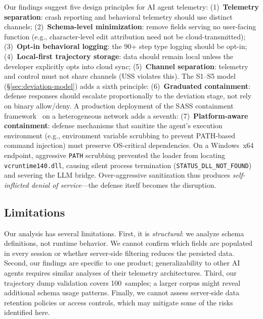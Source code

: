 \documentclass[sigconf,anonymous]{acmart}
\newcommand{\uss}{\textsc{USS}\xspace}              %
\begin{document}
Our findings suggest five design principles for AI agent telemetry:
(1)~\textbf{Telemetry separation}: crash reporting and behavioral
telemetry should use distinct channels;
(2)~\textbf{Schema-level minimization}: remove fields serving no
user-facing function (e.g., character-level edit attribution need not
be cloud-transmitted);
(3)~\textbf{Opt-in behavioral logging}: the 90+ step type logging
should be opt-in;
(4)~\textbf{Local-first trajectory storage}: data should remain local
unless the developer explicitly opts into cloud sync;
(5)~\textbf{Channel separation}: telemetry and control must not share
channels (\uss violates this).
The S1--S5 model (\S\ref{sec:deviation-model}) adds a sixth principle:
(6)~\textbf{Graduated containment}: defense responses should
escalate proportionally to the deviation stage, not rely on binary
allow/deny.
A production deployment of the SASS containment
framework~\cite{sass-draft} on a heterogeneous network adds a seventh:
(7)~\textbf{Platform-aware containment}: defense mechanisms that
sanitize the agent's execution environment (e.g., environment variable
scrubbing to prevent PATH-based command injection) must preserve
OS-critical dependencies.  On a Windows~x64 endpoint, aggressive
\texttt{PATH} scrubbing prevented the loader from locating
\texttt{vcruntime140.dll}, causing silent process termination
(\texttt{STATUS\_DLL\_NOT\_FOUND}) and severing the LLM bridge.
Over-aggressive sanitization thus produces \emph{self-inflicted denial
of service}---the defense itself becomes the disruption.

\subsection{Limitations}

Our analysis has several limitations.  First, it is \emph{structural}:
we analyze schema definitions, not runtime behavior.  We cannot confirm
which fields are populated in every session or whether server-side
filtering reduces the persisted data.  Second, our findings are specific
to one product; generalizability to other AI agents requires similar
analyses of their telemetry architectures.  Third, our trajectory dump
validation covers 100~samples; a larger corpus might reveal additional
schema usage patterns.  Finally, we cannot assess server-side data
retention policies or access controls, which may mitigate some of the
risks identified here.


\end{document}
